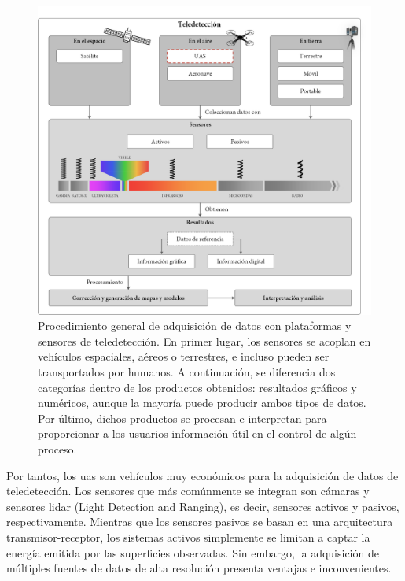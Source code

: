 \begin{figure}[!ht]
	\includegraphics{figs/introduction/introduction_scheme_spanish.png}
	\caption{Procedimiento general de adquisición de datos con plataformas y sensores de teledetección. En primer lugar, los sensores se acoplan en vehículos espaciales, aéreos o terrestres, e incluso pueden ser transportados por humanos. A continuación, se diferencia dos categorías dentro de los productos obtenidos: resultados gráficos y numéricos, aunque la mayoría puede producir ambos tipos de datos. Por último, dichos productos se procesan e interpretan para proporcionar a los usuarios información útil en el control de algún proceso. }
    \label{fig:introduction_scheme_spanish}
\end{figure}

Por tantos, los \acrshort{uas} son vehículos muy económicos para la adquisición de datos de teledetección. Los sensores que más comúnmente se integran son cámaras y sensores \acrshort{lidar} (Light Detection and Ranging), es decir, sensores activos y pasivos, respectivamente. Mientras que los sensores pasivos se basan en una arquitectura transmisor-receptor, los sistemas activos simplemente se limitan a captar la energía emitida por las superficies observadas. Sin embargo, la adquisición de múltiples fuentes de datos de alta resolución presenta ventajas e inconvenientes. 

